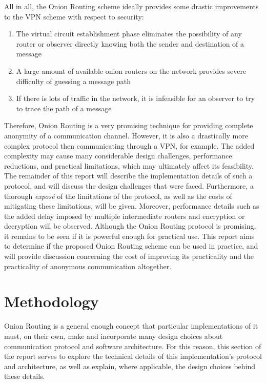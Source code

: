 \documentclass[10pt]{report}
\begin{document}
All in all, the Onion Routing scheme ideally provides some drastic improvements to the VPN scheme
with respect to security:
\begin{enumerate}
    \item The virtual circuit establishment phase eliminates the possibility of any router or
        observer directly knowing both the sender and destination of a message
    \item A large amount of available onion routers on the network provides severe difficulty of
        guessing a message path
    \item If there is lots of traffic in the network, it is infeasible for an observer to try to
        trace the path of a message
\end{enumerate}
Therefore, Onion Routing is a very promising technique for providing complete anonymity of a
communication channel. However, it is also a drastically more complex protocol then communicating
through a VPN, for example. The added complexity may cause many considerable design challenges,
performance reductions, and practical limitations, which may ultimately affect its feasibility.\\

The remainder of this report will describe the implementation details of such a protocol, and will
discuss the design challenges that were faced. Furthermore, a thorough \textit{expos\'e} of the
limitations of the protocol, as well as the costs of mitigating these limitations, will be given.
Moreover, performance details such as the added delay imposed by multiple intermediate routers and
encryption or decryption will be observed. Although the Onion Routing protocol is promising, it
remains to be seen if it is powerful enough for practical use. This report aims to determine if the
proposed Onion Routing scheme can be used in practice, and will provide discussion concerning the
cost of improving its practicality and the practicality of anonymous communication altogether.


\chapter{Methodology}
Onion Routing is a general enough concept that particular implementations of it must, on
their own, make and incorporate many design choices about communication protocol and software
architecture.  For this reason, this section of the report serves to explore the technical
details of this implementation's protocol and architecture, as well as explain, where
applicable, the design choices behind these details.
\end{document}
